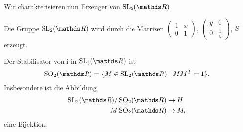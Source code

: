 Wir charakterisieren nun Erzeuger von $\SL_2(\R)$.
\begin{prop}
Die Gruppe $\SL_2(\R)$ wird durch die Matrizen $\begin{pmatrix}
1&x\\
0&1
\end{pmatrix}$,
$\begin{pmatrix}
y&0\\
0&\frac{1}{y}
\end{pmatrix}$, $S$
erzeugt.
\end{prop}

\begin{prop}
Der Stabilisator von $\mathrm{i}$ in $\SL_2(\R)$ ist
\begin{align*}
\SO_2(\R)=\{M \in \SL_2(\R) \mid M M^T=1\}.
\end{align*}
Insbesondere ist die Abbildung
\begin{align*}
\SL_2(\R)/\SO_2(\R) &\to H\\
M\SO_2(\R) &\mapsto M_i
\end{align*}
eine Bijektion.
\end{prop}


